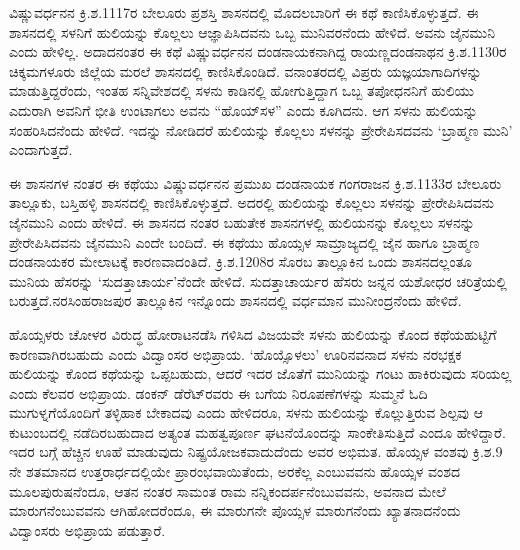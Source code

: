 ವಿಷ್ಣುವರ್ಧನನ ಕ್ರಿ.ಶ.1117ರ ಬೇಲೂರು ಪ್ರಶಸ್ತಿ ಶಾಸನದಲ್ಲಿ ಮೊದಲಬಾರಿಗೆ ಈ ಕಥೆ ಕಾಣಿಸಿಕೊಳ್ಳುತ್ತದೆ. ಈ ಶಾಸನದಲ್ಲಿ ಸಳನಿಗೆ ಹುಲಿಯನ್ನು ಕೊಲ್ಲಲು ಆಜ್ಞಾಪಿಸಿದವನು ಒಬ್ಬ ಮುನಿವರನೆಂದು ಹೇಳಿದೆ. ಅವನು ಜೈನಮುನಿ ಎಂದು ಹೇಳಿಲ್ಲ. ಅದಾದನಂತರ ಈ ಕಥೆ ವಿಷ್ಣುವರ್ಧನನ ದಂಡನಾಯಕನಾಗಿದ್ದ ರಾಯಣ್ಣದಂಡನಾಥನ ಕ್ರಿ.ಶ.1130ರ ಚಿಕ್ಕಮಗಳೂರು ಜಿಲ್ಲೆಯ ಮರಲೆ ಶಾಸನದಲ್ಲಿ ಕಾಣಿಸಿಕೊಂಡಿದೆ. ವನಾಂತರದಲ್ಲಿ ವಿಪ್ರರು ಯಜ್ಞಯಾಗಾದಿಗಳನ್ನು ಮಾಡುತ್ತಿದ್ದರೆಂದು, ಇಂತಹ ಸನ್ನಿವೇಶದಲ್ಲಿ ಸಳನು ಕಾಡಿನಲ್ಲಿ ಹೋಗುತ್ತಿದ್ದಾಗ ಒಬ್ಬ ತಪೋಧನನಿಗೆ ಹುಲಿಯು ಎದುರಾಗಿ ಅವನಿಗೆ ಭೀತಿ ಉಂಟಾಗಲು ಅವನು “ಹೊಯ್​ಸಳ” ಎಂದು ಕೂಗಿದನು. ಆಗ ಸಳನು ಹುಲಿಯನ್ನು ಸಂಹರಿಸಿದನೆಂದು ಹೇಳಿದೆ. ಇದನ್ನು ನೋಡಿದರೆ ಹುಲಿಯನ್ನು ಕೊಲ್ಲಲು ಸಳನನ್ನು ಪ್ರೇರೇಪಿಸದವನು ‘ಬ್ರಾಹ್ಮಣ ಮುನಿ’ ಎಂದಾಗುತ್ತದೆ.

ಈ ಶಾಸನಗಳ ನಂತರ ಈ ಕಥೆಯು ವಿಷ್ಣುವರ್ಧನನ ಪ್ರಮುಖ ದಂಡನಾಯಕ ಗಂಗರಾಜನ ಕ್ರಿ.ಶ.1133ರ ಬೇಲೂರು ತಾಲ್ಲೂಕು, ಬಸ್ತಿಹಳ್ಳಿ ಶಾಸನದಲ್ಲಿ ಕಾಣಿಸಿಕೊಳ್ಳುತ್ತದೆ. ಅದರಲ್ಲಿ ಹುಲಿಯನ್ನು ಕೊಲ್ಲಲು ಸಳನನ್ನು ಪ್ರೇರೇಪಿಸಿದವನು ಜೈನಮುನಿ ಎಂದು ಹೇಳಿದೆ. ಈ ಶಾಸನದ ನಂತರ ಬಹುತೇಕ ಶಾಸನಗಳಲ್ಲಿ ಹುಲಿಯನನ್ನು ಕೊಲ್ಲಲು ಸಳನನ್ನು ಪ್ರೇರೇಪಿಸಿದವನು ಜೈನಮುನಿ ಎಂದೇ ಬಂದಿದೆ. ಈ ಕಥೆಯು ಹೊಯ್ಸಳ ಸಾಮ್ರಾಜ್ಯದಲ್ಲಿ ಜೈನ ಹಾಗೂ ಬ್ರಾಹ್ಮಣ ದಂಡನಾಯಕರ ಮೇಲಾಟಕ್ಕೆ ಕಾರಣವಾದಂತಿದೆ. ಕ್ರಿ.ಶ.1208ರ ಸೊರಬ ತಾಲ್ಲೂಕಿನ ಒಂದು ಶಾಸನದಲ್ಲಂತೂ ಮುನಿಯ ಹೆಸರನ್ನು ‘ಸುದತ್ತಾಚಾರ್ಯ’ನೆಂದೇ ಹೇಳಿದೆ. ಸುದತ್ತಾಚಾರ್ಯರ ಹೆಸರು ಜನ್ನನ ಯಶೋಧರ ಚರಿತ್ರೆಯಲ್ಲಿ ಬರುತ್ತದೆ.\break ನರಸಿಂಹರಾಜಪುರ ತಾಲ್ಲೂಕಿನ ಇನ್ನೊಂದು ಶಾಸನದಲ್ಲಿ ವರ್ಧಮಾನ ಮುನೀಂದ್ರನೆಂದು ಹೇಳಿದೆ.

ಹೊಯ್ಸಳರು ಚೋಳರ ವಿರುದ್ಧ ಹೋರಾಟನಡೆಸಿ ಗಳಿಸಿದ ವಿಜಯವೇ ಸಳನು ಹುಲಿಯನ್ನು ಕೊಂದ ಕಥೆಯ\break ಹುಟ್ಟಿಗೆ ಕಾರಣವಾಗಿರಬಹುದು ಎಂದು ವಿದ್ವಾಂಸರ ಅಭಿಪ್ರಾಯ. ‘ಹೊಯ್ಸೊಳಲು’ ಊರಿನವನಾದ ಸಳನು ನರಭಕ್ಷಕ ಹುಲಿಯನ್ನು ಕೊಂದ ಕಥೆಯನ್ನು ಒಪ್ಪಬಹುದು, ಆದರೆ ಇದರ ಜೊತೆಗೆ ಮುನಿಯನ್ನು ಗಂಟು ಹಾಕಿರುವುದು ಸರಿಯಲ್ಲ ಎಂದು ಕೆಲವರ ಅಭಿಪ್ರಾಯ. ಡಂಕನ್​ ಡೆರೆಟ್​ರವರು ಈ ಬಗೆಯ ನಿರೂಪಣೆಗಳನ್ನು ಸುಮ್ಮನೆ ಓದಿ ಮುಗುಳ್ನಗೆಯೊಂದಿಗೆ ತಳ್ಳಿಹಾಕ ಬೇಕಾದವು ಎಂದು ಹೇಳಿದರೂ, ಸಳನು ಹುಲಿಯನ್ನು ಕೊಲ್ಲುತ್ತಿರುವ ಶಿಲ್ಪವು ಆ ಕುಟುಂಬದಲ್ಲಿ ನಡೆದಿರಬಹುದಾದ ಅತ್ಯಂತ ಮಹತ್ವಪೂರ್ಣ ಘಟನೆಯೊಂದನ್ನು ಸಾಂಕೇತಿಸುತ್ತಿದೆ ಎಂದೂ ಹೇಳಿದ್ದಾರೆ. ಇದರ ಬಗ್ಗೆ ಹೆಚ್ಚಿನ ಊಹೆ ಮಾಡುವುದು ನಿಷ್ಪ್ರಯೋಜಕವಾದುದೆಂದು ಅವರ ಅಭಿಮತ. ಹೊಯ್ಸಳ ವಂಶವು ಕ್ರಿ.ಶ.9 ನೇ ಶತಮಾನದ ಉತ್ತರಾರ್ಧದಲ್ಲಿಯೇ ಪ್ರಾರಂಭವಾಯಿತೆಂದು, ಅರಕೆಲ್ಲ ಎಂಬುವವನು ಹೊಯ್ಸಳ ವಂಶದ ಮೂಲಪುರುಷನೆಂದೂ, ಆತನ ನಂತರ ಸಾಮಂತ ರಾಮ ನನ್ನಿಕಂದರ್ಪನೆಂಬುವವನು, ಅವನಾದ ಮೇಲೆ ಮಾರುಗನೆಂಬುವವನು ಆಗಿಹೋದರೆಂದೂ, ಈ ಮಾರುಗನೇ ಪೊಯ್ಸಳ ಮಾರುಗನೆಂದು ಖ್ಯಾತನಾದನೆಂದು ವಿದ್ವಾಂಸರು ಅಭಿಪ್ರಾಯ ಪಡುತ್ತಾರೆ.

